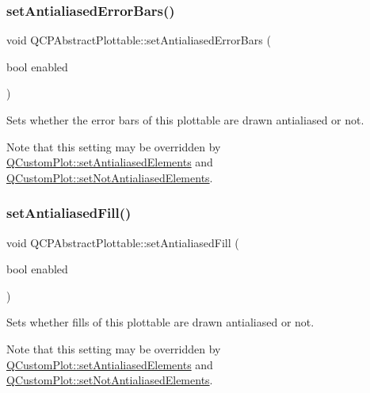 \hypertarget{class_q_c_p_abstract_plottable_a757beb744b96cf1855cca5ab9d3ecf52}{}\label{class_q_c_p_abstract_plottable_a757beb744b96cf1855cca5ab9d3ecf52} 
\subsubsection{\texorpdfstring{set\+Antialiased\+Error\+Bars()}{setAntialiasedErrorBars()}}
{\footnotesize\ttfamily void Q\+C\+P\+Abstract\+Plottable\+::set\+Antialiased\+Error\+Bars (\begin{DoxyParamCaption}\item[{bool}]{enabled }\end{DoxyParamCaption})}

Sets whether the error bars of this plottable are drawn antialiased or not.

Note that this setting may be overridden by \hyperlink{class_q_custom_plot_af6f91e5eab1be85f67c556e98c3745e8}{Q\+Custom\+Plot\+::set\+Antialiased\+Elements} and \hyperlink{class_q_custom_plot_ae10d685b5eabea2999fb8775ca173c24}{Q\+Custom\+Plot\+::set\+Not\+Antialiased\+Elements}. \hypertarget{class_q_c_p_abstract_plottable_a089d6b5577120239b55c39ed27c39536}{}\label{class_q_c_p_abstract_plottable_a089d6b5577120239b55c39ed27c39536} 
\subsubsection{\texorpdfstring{set\+Antialiased\+Fill()}{setAntialiasedFill()}}
{\footnotesize\ttfamily void Q\+C\+P\+Abstract\+Plottable\+::set\+Antialiased\+Fill (\begin{DoxyParamCaption}\item[{bool}]{enabled }\end{DoxyParamCaption})}

Sets whether fills of this plottable are drawn antialiased or not.

Note that this setting may be overridden by \hyperlink{class_q_custom_plot_af6f91e5eab1be85f67c556e98c3745e8}{Q\+Custom\+Plot\+::set\+Antialiased\+Elements} and \hyperlink{class_q_custom_plot_ae10d685b5eabea2999fb8775ca173c24}{Q\+Custom\+Plot\+::set\+Not\+Antialiased\+Elements}. \hypertarget{class_q_c_p_abstract_plottable_a2f03f067ede2ed4da6f7d0e4777a3f02}{}\label{class_q_c_p_abstract_plottable_a2f03f067ede2ed4da6f7d0e4777a3f02} 
